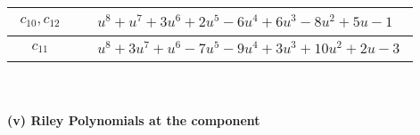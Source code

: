 \documentclass[1p]{elsarticle_modified}
\theoremstyle{definition}
\begin{document}
\begin{tabular}{m{50pt}|m{274pt}}
\hline $$\begin{aligned}c_{10},c_{12}\end{aligned}$$&$\begin{aligned}
&u^8+u^7+3 u^6+2 u^5-6 u^4+6 u^3-8 u^2+5 u-1
\end{aligned}$\\
\hline $$\begin{aligned}c_{11}\end{aligned}$$&$\begin{aligned}
&u^8+3 u^7+u^6-7 u^5-9 u^4+3 u^3+10 u^2+2 u-3
\end{aligned}$\\
\hline
\end{tabular}\\~\\
\newpage\renewcommand{\arraystretch}{1}
\flushleft \textbf{(v) Riley Polynomials at the component}\newline \\
\end{document}
